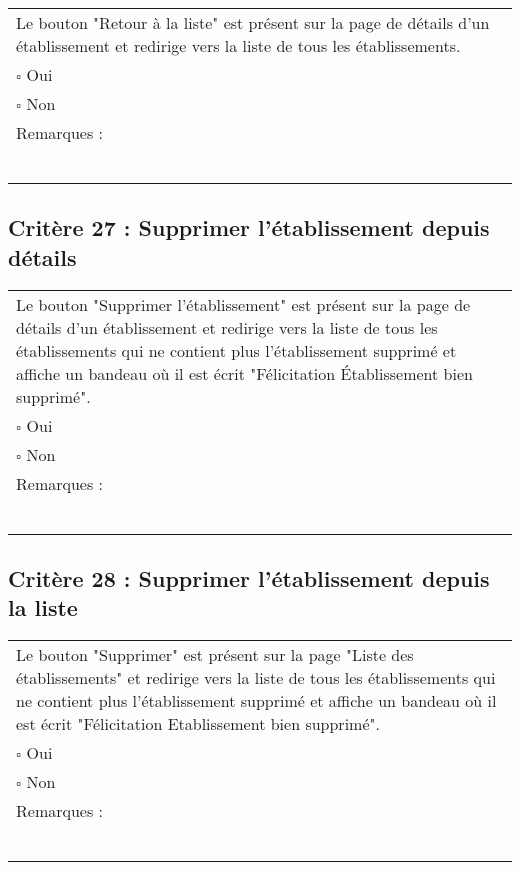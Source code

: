	\begin{center}
    	 		\begin{tabular}[h]{|p{}|}
			\hline
				Le bouton "Retour à la liste" est présent sur la page de détails d'un établissement et redirige vers la liste de tous les établissements.\\
				$\square$ Oui  \\ $\square$ Non \\\hline Remarques : \\ ~\\
			 \\\hline
     		\end{tabular}
  		\end{center}	
  		
  		
  		\subsection*{Critère 27 : Supprimer l'établissement depuis détails}
	
	\begin{center}
    	 		\begin{tabular}[h]{|p{}|}
			\hline
				Le bouton "Supprimer l'établissement" est présent sur la page de détails d'un établissement et redirige vers la liste de tous les établissements qui ne contient plus l'établissement supprimé et affiche un bandeau où il est écrit "Félicitation Établissement bien supprimé".\\
				$\square$ Oui  \\ $\square$ Non \\\hline Remarques : \\ ~\\
			 \\\hline
     		\end{tabular}
  		\end{center}
  		
  		
  		
  			\subsection*{Critère 28 : Supprimer l'établissement depuis la liste}
	
	\begin{center}
    	 		\begin{tabular}[h]{|p{}|}
			\hline
				Le bouton "Supprimer" est présent sur la page "Liste des établissements" et redirige vers la liste de tous les établissements qui ne contient plus l'établissement supprimé et affiche un bandeau où il est écrit "Félicitation Etablissement bien supprimé".\\
				$\square$ Oui  \\ $\square$ Non \\\hline Remarques : \\ ~\\
			 \\\hline
     		\end{tabular}
  		\end{center}

